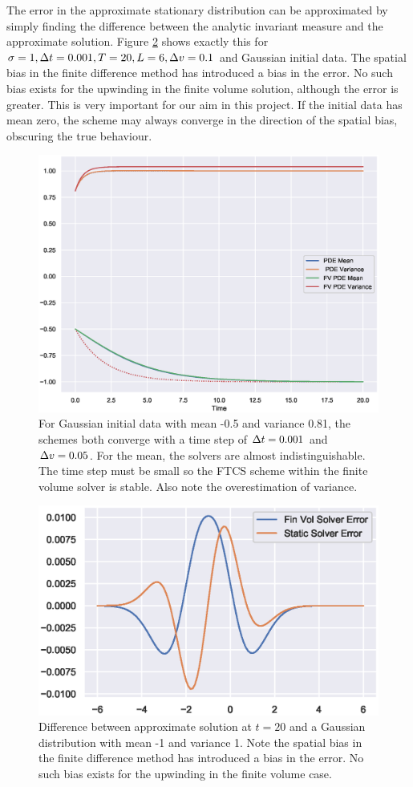     The error in the approximate stationary distribution can be approximated by simply finding the difference between the analytic invariant measure and the approximate solution. Figure \ref{fig:homkinerror} shows exactly this for $\sigma = 1, \Delta t = 0.001, T = 20, L=6, \Delta v = 0.1$ and Gaussian initial data. The spatial bias in the finite difference method has introduced a bias in the error. No such bias exists for the upwinding in the finite volume solution, although the error is greater. This is very important for our aim in this project. If the initial data has mean zero, the scheme may always converge in the direction of the spatial bias, obscuring the true behaviour. 
    
    \begin{figure}
        \centering
        \includegraphics[width=0.7\linewidth]{Figures/kinmodelmomvar}
        \caption[Convergence of Moments for Kinetic Model]{For Gaussian initial data with mean -0.5 and variance 0.81, the schemes both converge with a time step of $\Delta t =0.001$ and $\Delta v = 0.05$. For the mean, the solvers are almost indistinguishable. The time step must be small so the FTCS scheme within the finite volume solver is stable. Also note the overestimation of variance. }
        \label{fig:kinmodelmomvar}
    \end{figure}

    \begin{figure}
        \centering
        \includegraphics[width=0.7\linewidth]{Figures/homkinerror}
        \caption[Error of the Schemes]{Difference between approximate solution at $t=20$ and a Gaussian distribution with mean -1 and variance 1. Note the spatial bias in the finite difference method has introduced a bias in the error. No such bias exists for the upwinding in the finite volume case.}
        \label{fig:homkinerror}
    \end{figure}
